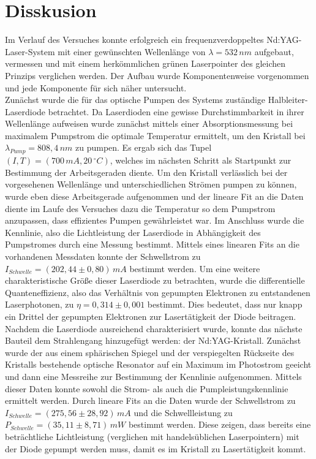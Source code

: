 \documentclass[twoside,colorback,accentcolor=tud4c,11pt]{tudreport}
\begin{document}
\chapter{Disskusion}
Im Verlauf des Versuches konnte erfolgreich ein frequenzverdoppeltes Nd:YAG-Laser-System mit einer gewünschten Wellenlänge von $\lambda=532\,\si{nm}$ aufgebaut, vermessen und mit einem herkömmlichen grünen Laserpointer des gleichen Prinzips verglichen werden. Der Aufbau wurde Komponentenweise vorgenommen und jede Komponente für sich näher untersucht.\\
Zunächst wurde die für das optische Pumpen des Systems zuständige Halbleiter-Laserdiode betrachtet. Da Laserdioden eine gewisse Durchstimmbarkeit in ihrer Wellenlänge aufweisen wurde zunächst mittels einer Absorptionsmessung bei maximalem Pumpstrom die optimale Temperatur ermittelt, um den Kristall bei $\lambda_{Pump}=808,4\,\si{nm}$ zu pumpen. Es ergab sich das Tupel $(I,T)=(700\,\si{mA},20\,\si{^{\circ}C})$, welches im nächsten Schritt als Startpunkt zur Bestimmung der Arbeitsgeraden diente. Um den Kristall verlässlich bei der vorgesehenen Wellenlänge und unterschiedlichen Strömen pumpen zu können, wurde eben diese Arbeitsgerade aufgenommen und der lineare Fit an die Daten diente im Laufe des Versuches dazu die Temperatur so dem Pumpstrom anzupassen, dass effizientes Pumpen gewährleistet war.
Im Anschluss wurde die Kennlinie, also die Lichtleistung der Laserdiode in Abhängigkeit des Pumpstromes durch eine Messung bestimmt. Mittels eines linearen Fits an die vorhandenen Messdaten konnte der Schwellstrom zu $I_{Schwelle}=(202,44\pm 0,80)\,\si{mA}$ bestimmt werden. Um eine weitere charakteristische Größe dieser Laserdiode zu betrachten, wurde die differentielle Quanteneffizienz, also das Verhältnis von gepumpten Elektronen zu entstandenen Laserphotonen, zu $\eta=0,314 \pm 0,001$ bestimmt. Dies bedeutet, dass nur knapp ein Drittel der gepumpten Elektronen zur Lasertätigkeit der Diode beitragen.\\
Nachdem die Laserdiode ausreichend charakterisiert wurde, konnte das nächste Bauteil dem Strahlengang hinzugefügt werden: der Nd:YAG-Kristall. Zunächst wurde der aus einem sphärischen Spiegel und der verspiegelten Rückseite des Kristalls bestehende optische Resonator auf ein Maximum im Photostrom geeicht und dann eine Messreihe zur Bestimmung der Kennlinie aufgenommen. Mittels dieser Daten konnte sowohl die Strom- als auch die Pumpleistungskennlinie ermittelt werden. Durch lineare Fits an die Daten wurde der Schwellstrom zu $I_{Schwelle}=(275,56\pm 28,92)\,\si{mA}$ und die Schwellleistung zu $P_{Schwelle}=(35,11\pm 8,71)\,\si{mW}$ bestimmt werden. Diese zeigen, dass bereits eine beträchtliche Lichtleistung (verglichen mit handelsüblichen Laserpointern) mit der Diode gepumpt werden muss, damit es im Kristall zu Lasertätigkeit kommt.
\end{document}
